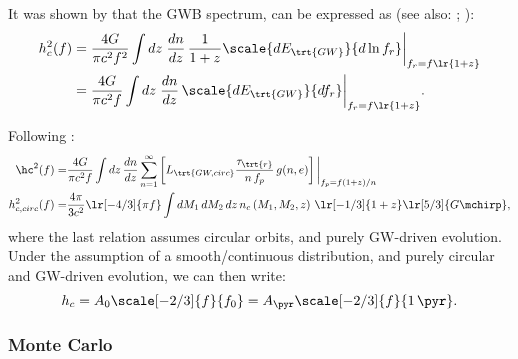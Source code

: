 \documentclass[10pt, oneside, onecolumn]{article}   	%
\newcommand{\lgwc}{L_\trt{GW,circ}}
\newcommand{\thard}{\tau_\trt{r}}
\begin{document}
            It was shown by \citet[][Eq.5]{Phinney-2001} that the GWB spectrum, can be expressed as
            (see also: \citealt[][Eq.~3.5/10/11]{enoki2007a}; \citealt[][Eq.5]{sesana2008}):
            \begin{subequations}
            \begin{align}
                h_c^2(f)
                & = \frac{4G}{\pi c^2 f^2} \int dz \; \frac{dn}{dz} \, \frac{1}{1+z} \scale{dE_\trt{GW}}{d \ln f_r} \bigg|_{f_r=f\lr{1+z}} \\
                & = \frac{4G}{\pi c^2 f} \int dz \; \frac{dn}{dz} \, \scale{dE_\trt{GW}}{d f_r} \bigg|_{f_r=f\lr{1+z}}.
            \end{align}
            \end{subequations}

            Following \citet[][Eq.~3.5/10/11; same as Eq.~\ref{eq:lum_gw} above]{enoki2007a}:
            \begin{subequations}
            \begin{align}
                \hc^2(f) = & \frac{4G}{\pi c^2 f} \int dz \, \frac{dn}{dz}
                    \sum_{n=1}^\infty \left[ \lgwc \frac{\thard}{n \, f_p} \, g(n,e) \right] \bigg|_{f_p = f(1+z)/n} \\
                h^2_{c,circ}(f) = & \frac{4 \pi}{3c^2} \lr[-4/3]{\pi f} \int dM_1 \, dM_2 \, dz \, n_c\left(M_1, M_2, z\right) \,
                    \lr[-1/3]{1+z} \lr[5/3]{G \mchirp},
            \end{align}
            \end{subequations}
            where the last relation assumes circular orbits, and purely GW-driven evolution. \\

            Under the assumption of a smooth/continuous distribution, and purely circular and GW-driven evolution, we can then write:
            \begin{equation}
                h_c = A_0 \scale[-2/3]{f}{f_0} = A_{\pyr} \scale[-2/3]{f}{1 \, \pyr}.
            \end{equation}

            \subsubsection{Monte Carlo}
\end{document}
